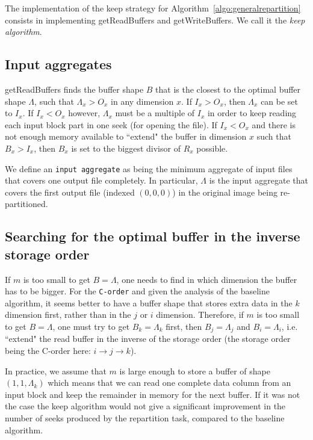 \documentclass[sigconf, nonacm]{acmart}
\begin{document}
The implementation of the keep strategy for
Algorithm~\ref{algo:generalrepartition} consists in implementing
getReadBuffers and getWriteBuffers. We call it the \emph{keep algorithm}.

\subsection{Input aggregates}
getReadBuffers finds the buffer shape $B$ that is the closest to the optimal buffer
shape $\Lambda$, such that $\Lambda_x>O_x$ in any dimension $x$.
If $I_x > O_x$, then $\Lambda_x$ can be set to $I_x$. If $I_x < O_x$ however,
$\Lambda_x$ must be a multiple of $I_x$ in order to keep reading each input
block part in one seek (for opening the file).
If $I_x < O_x$ and there is not enough memory available to ``extend"
the buffer in dimension $x$ such that $B_x > I_x$, then $B_x$ is set to the
biggest divisor of $R_x$ possible.

We define an \texttt{input aggregate} as being the minimum aggregate of input
files that covers one output file completely. In particular, $\Lambda$ is the
input aggregate that covers the first output file (indexed $(0,0,0)$) in the
original image being re-partitioned.

\subsection{Searching for the optimal buffer in the inverse storage order}
If $m$ is too small to get $B=\Lambda$, one needs to find in which dimension
the buffer has to be bigger.
For the \texttt{C-order} and given the analysis of the baseline algorithm,
it seems better to have a buffer shape that stores extra data in the $k$
dimension first, rather than in the $j$ or $i$ dimension.
Therefore, if $m$ is too small to get $B=\Lambda$, one must try to get
$B_k=\Lambda_k$ first, then $B_j=\Lambda_j$ and $B_i=\Lambda_i$, i.e. ``extend"
the read buffer in the inverse of the storage order (the storage order being the
C-order here: $i\rightarrow j\rightarrow k$).

In practice, we assume that $m$ is large enough to store a buffer of shape
$(1,1,\Lambda_k)$ which means that we can read one complete data column from an
input block and keep the remainder in memory for the next buffer.
If it was not the case the keep algorithm would not give a significant
improvement in the number of seeks produced by the repartition task, compared
to the baseline algorithm.
\end{document}

